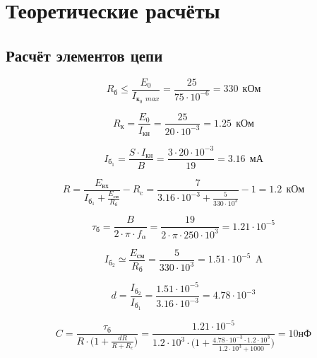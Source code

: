 \section{Теоретические расчёты}

\subsection{Расчёт элементов цепи}

\begin{displaymath}
R_\text{б} \leq \frac{E_0}{I_{\text{к}_0\ \ max}} = \frac{25}{75 \cdot 10^{-6}} = 330\ \ \text{кОм}
\end{displaymath}

\begin{displaymath}
R_\text{к} = \frac{E_0}{I_\text{кн}} = \frac{25}{20 \cdot 10^{-3}} = 1.25\ \ \text{кОм}
\end{displaymath}

\begin{displaymath}
I_{\text{б}_1} = \frac{S \cdot I_\text{кн}}{B} = \frac{3 \cdot 20 \cdot 10^{-3}}{19} = 3.16\ \ \text{мА}
\end{displaymath}

\begin{displaymath}
R = \frac{E_\text{вх}}{I_{\text{б}_1} + \frac{E_\text{см}}{R_\text{б}}} - R_\text{c} = \frac{7}{3.16 \cdot 10^{-3} + \frac{5}{330 \cdot 10^3}} - 1 = 1.2\ \ \text{кОм}
\end{displaymath}

\begin{displaymath}
\tau_{\text{б}} = \frac{B}{2 \cdot \pi \cdot f_\alpha} = \frac{19}{2 \cdot \pi \cdot 250 \cdot 10^3} = 1.21 \cdot 10^{-5}
\end{displaymath}

\begin{displaymath}
I_{\text{б}_2} \simeq \frac{E_\text{см}}{R_\text{б}} = \frac{5}{330 \cdot 10^3} = 1.51 \cdot 10^{-5}\ \ \text{A}
\end{displaymath}

\begin{displaymath}
d = \frac{I_{\text{б}_2}}{I_{\text{б}_1}} = \frac{ 1.51 \cdot 10^{-5}}{3.16 \cdot 10^{-3}} = 4.78 \cdot 10^{-3}
\end{displaymath}

\begin{displaymath}
C = \frac{\tau_{\text{б}}}{R \cdot \Big ( 1 + \frac{dR}{R+R_c} \Big )} = \frac{1.21 \cdot 10^{-5}}{1.2 \cdot 10^3 \cdot \Big ( 1 + \frac{4.78 \cdot 10^{-3} \cdot 1.2 \cdot 10^3}{1.2 \cdot 10^3+1000} \Big )} = 10 \text{нФ}
\end{displaymath}

